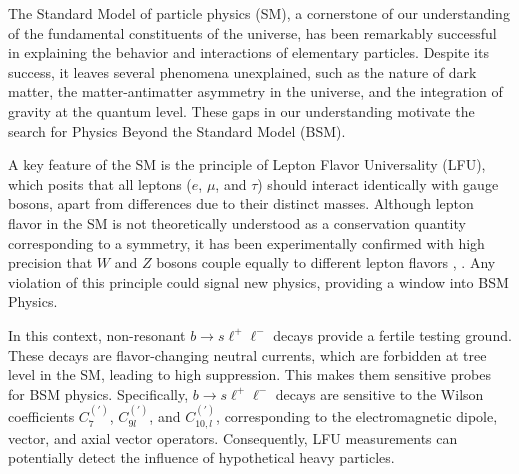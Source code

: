 The Standard Model of particle physics (SM), a cornerstone of our 
understanding of the fundamental constituents of the universe, 
has been remarkably successful in explaining the behavior 
and interactions of elementary particles. Despite its success, 
it leaves several phenomena unexplained, such as the 
nature of dark matter, the matter-antimatter asymmetry in the 
universe, and the integration of gravity at the quantum level. 
These gaps in our understanding motivate the search for Physics 
Beyond the Standard Model (BSM).\cite{SM_BSM}

A key feature of the SM is the principle of Lepton 
Flavor Universality (LFU), which posits that all leptons ($e$, 
$\mu$, and $\tau$) should interact identically with gauge bosons, 
apart from differences due to their distinct masses. Although 
lepton flavor in the SM is not theoretically understood 
as a conservation quantity corresponding to a symmetry, it has 
been experimentally confirmed with high precision that $W$ and $Z$ 
bosons couple equally to different lepton flavors \cite{LU_CDF}, 
\cite{LU_ATLAS}. Any violation of this principle could signal new 
physics, providing a window into BSM Physics.

In this context, non-resonant $b\to s\ell^+\ell^-$ decays provide a fertile 
testing ground. These decays are flavor-changing neutral currents, 
which are forbidden at tree level in the SM, leading to high suppression. 
This makes them sensitive probes for BSM physics. Specifically, 
$b\to s\ell^+\ell^-$ decays are sensitive to the Wilson coefficients 
$C_7^{\scriptscriptstyle (')}$, $C_{9l}^{\scriptscriptstyle (')}$, and 
$C_{10,l}^{\scriptscriptstyle (')}$, corresponding to the electromagnetic 
dipole, vector, and axial vector operators. 
Consequently, LFU measurements can potentially detect the influence 
of hypothetical heavy particles.


